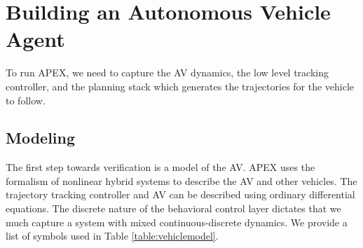 \section{Building an Autonomous Vehicle Agent}
To run APEX, we need to capture the AV dynamics, the low level tracking controller, and the planning stack which generates the trajectories for the vehicle to follow. 
\subsection{Modeling}
\label{sec:experiment}
The first step towards verification is a model of the AV.
APEX uses the formalism of nonlinear hybrid systems to describe the AV and other vehicles.
The trajectory tracking controller and AV can be described using ordinary differential equations. 
The discrete nature of the behavioral control layer dictates that we much capture a system with mixed continuous-discrete dynamics. 
We provide a list of symbols used in Table \ref{table:vehiclemodel}.


